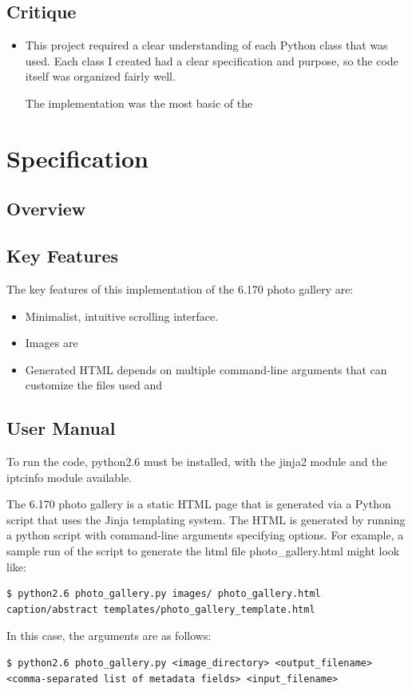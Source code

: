 \documentclass[11pt,letterpaper]{article}
\begin{document}
\subsection{Critique}
\begin{itemize}
\item This project required a clear understanding of each Python class that was used. Each class I created had a clear specification and purpose, so the code itself was organized fairly well.

The implementation was the most basic of the 
\end{itemize}
\section{Specification}
\subsection{Overview}
\subsection{Key Features}
The key features of this implementation of the 6.170 photo gallery are:
\begin{itemize}
\item Minimalist, intuitive scrolling interface.
\item Images are 
\item Generated HTML depends on multiple command-line arguments that can customize the files used and
\end{itemize}
\subsection{User Manual}
To run the code, python2.6 must be installed, with the jinja2 module and the iptcinfo module available.

The 6.170 photo gallery is a static HTML page that is generated via a Python script that uses the Jinja templating system. The HTML is generated by running a python script with command-line arguments specifying options.
For example, a sample run of the script to generate the html file photo\_gallery.html might look like:
\begin{verbatim}
$ python2.6 photo_gallery.py images/ photo_gallery.html caption/abstract templates/photo_gallery_template.html
\end{verbatim}
In this case, the arguments are as follows:
\begin{verbatim}
$ python2.6 photo_gallery.py <image_directory> <output_filename> <comma-separated list of metadata fields> <input_filename>
\end{verbatim}
\end{document}
